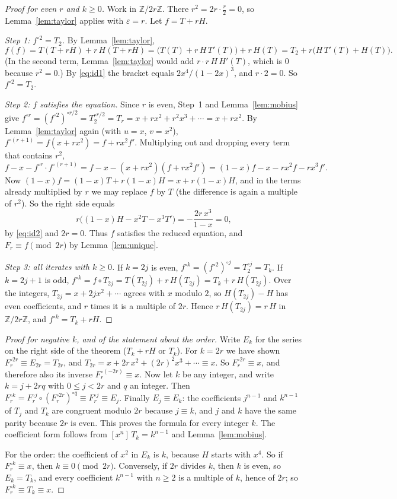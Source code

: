 \documentclass[11pt,a4paper]{article}
\theoremstyle{definition}
\theoremstyle{remark}
\newcommand{\Z}{\mathbb{Z}}
\newcommand{\coeff}[2]{[x^{#1}]\,#2}
\begin{document}
\begin{proof}[Proof for even $r$ and $k\ge0$]
Work in $\Z/2r\Z$. There $r^2=2r\cdot\frac r2=0$, so Lemma~\ref{lem:taylor} applies with $\varepsilon=r$. Let
$f=T+rH$.

\emph{Step 1: $f^{\circ2}=T_2$.} By Lemma~\ref{lem:taylor},
\[
f(f)=T(T+rH)+r\,H(T+rH)=\bigl(T(T)+r\,H\,T'(T)\bigr)+r\,H(T)=T_2+r\bigl(H\,T'(T)+H(T)\bigr).
\]
(In the second term, Lemma~\ref{lem:taylor} would add $r\cdot r\,H\,H'(T)$, which is $0$ because $r^2=0$.) By
\eqref{eq:id1} the bracket equals $2x^4/(1-2x)^3$, and $r\cdot2=0$. So $f^{\circ2}=T_2$.

\emph{Step 2: $f$ satisfies the equation.} Since $r$ is even, Step~1 and Lemma~\ref{lem:mobius} give
$f^{\circ r}=(f^{\circ2})^{\circ r/2}=T_2^{\circ r/2}=T_r=x+rx^2+r^2x^3+\cdots=x+rx^2$. By Lemma~\ref{lem:taylor} again
(with $u=x$, $v=x^2$), $f^{\circ(r+1)}=f(x+rx^2)=f+rx^2f'$. Multiplying out and dropping every term that contains
$r^2$,
\[
f-x-f^{\circ r}\cdot f^{\circ(r+1)}=f-x-(x+rx^2)(f+rx^2f')=(1-x)f-x-rx^2f-rx^3f'.
\]
Now $(1-x)f=(1-x)T+r(1-x)H=x+r(1-x)H$, and in the terms already multiplied by $r$ we may replace $f$ by $T$ (the
difference is again a multiple of $r^2$). So the right side equals
\[
r\bigl((1-x)H-x^2T-x^3T'\bigr)=-\frac{2r\,x^3}{1-x}=0,
\]
by \eqref{eq:id2} and $2r=0$. Thus $f$ satisfies the reduced equation, and $F_r\equiv f\pmod{2r}$ by
Lemma~\ref{lem:unique}.

\emph{Step 3: all iterates with $k\ge0$.} If $k=2j$ is even, $f^{\circ k}=(f^{\circ 2})^{\circ j}=T_2^{\circ j}=T_k$.
If $k=2j+1$ is odd, $f^{\circ k}=f\circ T_{2j}=T(T_{2j})+r\,H(T_{2j})=T_k+r\,H(T_{2j})$. Over the integers,
$T_{2j}=x+2jx^2+\cdots$ agrees with $x$ modulo $2$, so $H(T_{2j})-H$ has even coefficients, and $r$ times it is a
multiple of $2r$. Hence $r\,H(T_{2j})=r\,H$ in $\Z/2r\Z$, and $f^{\circ k}=T_k+rH$.
\end{proof}

\begin{proof}[Proof for negative $k$, and of the statement about the order]
Write $E_k$ for the series on the right side of the theorem ($T_k+rH$ or $T_k$). For $k=2r$ we have shown
$F_r^{\circ 2r}\equiv E_{2r}=T_{2r}$, and $T_{2r}=x+2r\,x^2+(2r)^2x^3+\cdots\equiv x$. So $F_r^{\circ2r}\equiv x$, and
therefore also its inverse $F_r^{\circ(-2r)}\equiv x$. Now let $k$ be any integer, and write $k=j+2rq$ with
$0\le j<2r$ and $q$ an integer. Then $F_r^{\circ k}=F_r^{\circ j}\circ(F_r^{\circ 2r})^{\circ q}\equiv F_r^{\circ j}\equiv E_j$.
Finally $E_j\equiv E_k$: the coefficients $j^{n-1}$ and $k^{n-1}$ of $T_j$ and $T_k$ are congruent modulo $2r$
because $j\equiv k$, and $j$ and $k$ have the same parity because $2r$ is even. This proves the formula for every
integer $k$. The coefficient form follows from $\coeff{n}{T_k}=k^{n-1}$ and Lemma~\ref{lem:mobius}.

For the order: the coefficient of $x^2$ in $E_k$ is $k$, because $H$ starts with $x^4$. So if $F_r^{\circ k}\equiv x$,
then $k\equiv0\pmod{2r}$. Conversely, if $2r$ divides $k$, then $k$ is even, so $E_k=T_k$, and every coefficient
$k^{n-1}$ with $n\ge2$ is a multiple of $k$, hence of $2r$; so $F_r^{\circ k}\equiv T_k\equiv x$.
\end{proof}
\end{document}
